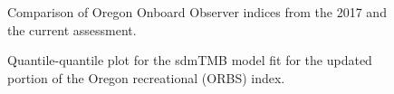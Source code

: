 \documentclass[
]{scrartcl}
\begin{document}
\begin{figure}


\caption{\label{fig-ORFS_comp}Comparison of Oregon Onboard Observer
indices from the 2017 and the current assessment.}

\end{figure}%

\begin{figure}


\caption{\label{fig-orbs_qq}Quantile-quantile plot for the sdmTMB model
fit for the updated portion of the Oregon recreational (ORBS) index.}

\end{figure}%
\end{document}
